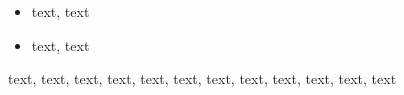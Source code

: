 
\begin{itemize}
\item text, text
\item text, text
\end{itemize}





text, text, text, text, text, text, text, text, text, text, text, text
\medskip



\divider

\divider

\divider

\divider





